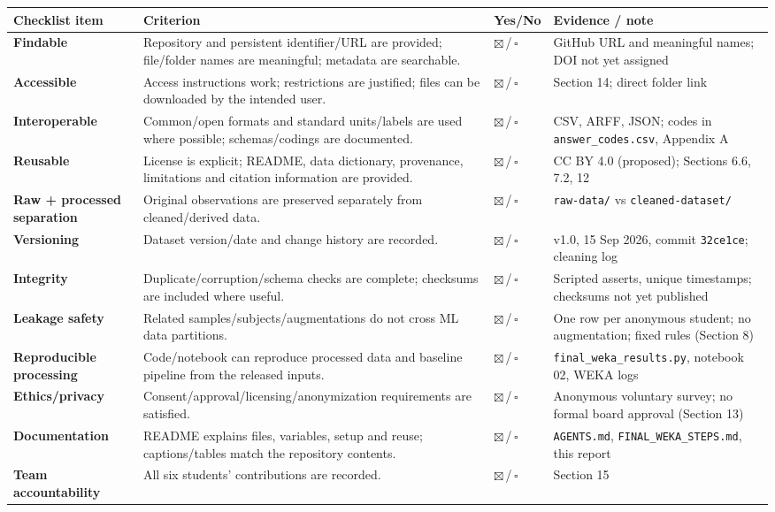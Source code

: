 \documentclass[11pt,a4paper]{article}
\newcommand{\hd}[1]{\textbf{#1}}
\newcommand{\yes}{$\boxtimes$\,/\,$\square$}
\begin{document}
{\footnotesize
\begin{tabularx}{\linewidth}{|L{30mm}|Y|C{14mm}|L{50mm}|}
\hline
{}\hd{Checklist item} & \hd{Criterion} & \hd{Yes/No} & \hd{Evidence / note} \\ \hline
\hd{Findable} & Repository and persistent identifier/URL are provided; file/folder names are meaningful; metadata are searchable. & \yes & GitHub URL and meaningful names; DOI not yet assigned \\ \hline
\hd{Accessible} & Access instructions work; restrictions are justified; files can be downloaded by the intended user. & \yes & Section 14; direct folder link \\ \hline
\hd{Interoperable} & Common/open formats and standard units/labels are used where possible; schemas/codings are documented. & \yes & CSV, ARFF, JSON; codes in \texttt{answer\_codes.csv}, Appendix A \\ \hline
\hd{Reusable} & License is explicit; README, data dictionary, provenance, limitations and citation information are provided. & \yes & CC BY 4.0 (proposed); Sections 6.6, 7.2, 12 \\ \hline
\hd{Raw + processed separation} & Original observations are preserved separately from cleaned/derived data. & \yes & \texttt{raw-data/} vs \texttt{cleaned-dataset/} \\ \hline
\hd{Versioning} & Dataset version/date and change history are recorded. & \yes & v1.0, 15 Sep 2026, commit \texttt{32ce1ce}; cleaning log \\ \hline
\hd{Integrity} & Duplicate/corruption/schema checks are complete; checksums are included where useful. & \yes & Scripted asserts, unique timestamps; checksums not yet published \\ \hline
\hd{Leakage safety} & Related samples/subjects/augmentations do not cross ML data partitions. & \yes & One row per anonymous student; no augmentation; fixed rules (Section 8) \\ \hline
\hd{Reproducible processing} & Code/notebook can reproduce processed data and baseline pipeline from the released inputs. & \yes & \texttt{final\_weka\_results.py}, notebook 02, WEKA logs \\ \hline
\hd{Ethics/privacy} & Consent/approval/licensing/anonymization requirements are satisfied. & \yes & Anonymous voluntary survey; no formal board approval (Section 13) \\ \hline
\hd{Documentation} & README explains files, variables, setup and reuse; captions/tables match the repository contents. & \yes & \texttt{AGENTS.md}, \texttt{FINAL\_WEKA\_STEPS.md}, this report \\ \hline
\hd{Team accountability} & All six students' contributions are recorded. & \yes & Section 15 \\ \hline
\end{tabularx}}
\end{document}
